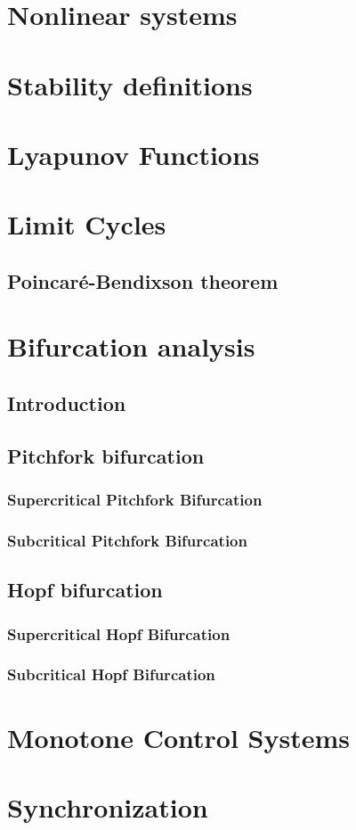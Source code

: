 \section{Nonlinear systems}
\section{Stability definitions}
\section{Lyapunov Functions}
\section{Limit Cycles}
\subsection{Poincaré-Bendixson theorem}
\section{Bifurcation analysis}
\subsection{Introduction}
\subsection{Pitchfork bifurcation}
\subsubsection{Supercritical Pitchfork Bifurcation}
\subsubsection{Subcritical Pitchfork Bifurcation}
\subsection{Hopf bifurcation}
\subsubsection{Supercritical Hopf Bifurcation}
\subsubsection{Subcritical Hopf Bifurcation}

\section{Monotone Control Systems}

\section{Synchronization}
